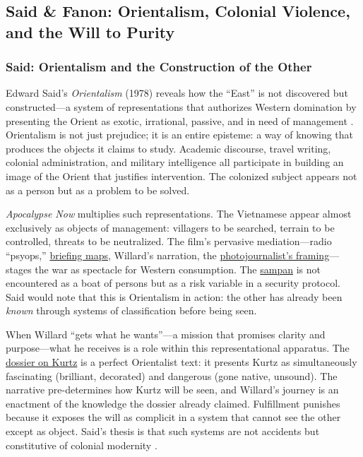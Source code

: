 \subsection*{Said \& Fanon: Orientalism, Colonial Violence, and the Will to Purity}
\label{ssec:v-said-fanon}

\subsubsection*{Said: Orientalism and the Construction of the Other}
Edward Said's \textit{Orientalism} (1978) reveals how the ``East'' is not discovered but
constructed---a system of representations that authorizes Western domination by presenting the
Orient as exotic, irrational, passive, and in need of management \parencite{SaidOrientalism1978}.
Orientalism is not just prejudice; it is an entire episteme: a way of knowing that produces the
objects it claims to study. Academic discourse, travel writing, colonial administration, and
military intelligence all participate in building an image of the Orient that justifies
intervention. The colonized subject appears not as a person but as a problem to be solved.

\textit{Apocalypse Now} multiplies such representations. The Vietnamese appear almost
exclusively as objects of management: villagers to be searched, terrain to be controlled,
threats to be neutralized. The film's pervasive mediation---radio ``psyops,''
\hyperref[scene:briefing]{briefing maps}, Willard's narration, the
\hyperref[scene:kurtz-compound]{photojournalist's framing}---stages the war as spectacle for
Western consumption. The \hyperref[scene:sampan]{sampan} is not encountered as a boat of persons
but as a risk variable in a security protocol. Said would note that this is Orientalism in
action: the other has already been \emph{known} through systems of classification before being
seen.

When Willard ``gets what he wants''---a mission that promises clarity and purpose---what he
receives is a role within this representational apparatus. The
\hyperref[scene:dossier-reading]{dossier on Kurtz} is a perfect Orientalist text: it presents
Kurtz as simultaneously fascinating (brilliant, decorated) and dangerous (gone native,
unsound). The narrative pre-determines how Kurtz will be seen, and Willard's journey is an
enactment of the knowledge the dossier already claimed. Fulfillment
punishes because it exposes the will as complicit in a system that cannot see the other except
as object. Said's thesis is that such systems are not accidents but constitutive of colonial
modernity \parencite{SaidOrientalism1978}.

